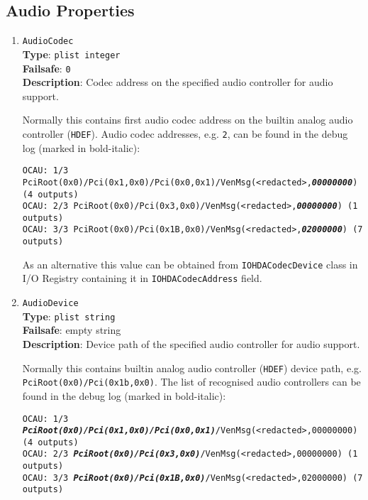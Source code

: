 \documentclass[]{article}
\begin{document}
\subsection{Audio Properties}\label{uefiaudioprops}

\begin{enumerate}

\item
  \texttt{AudioCodec}\\
  \textbf{Type}: \texttt{plist\ integer}\\
  \textbf{Failsafe}: \texttt{0}\\
  \textbf{Description}: Codec address on the specified audio controller for audio support.

  Normally this contains first audio codec address on the builtin analog audio controller (\texttt{HDEF}).
  Audio codec addresses, e.g. \texttt{2}, can be found in the debug log (marked in bold-italic):

  \texttt{OCAU: 1/3 PciRoot(0x0)/Pci(0x1,0x0)/Pci(0x0,0x1)/VenMsg(<redacted>,\textit{\textbf{00000000}}) (4 outputs)}\\
  \texttt{OCAU: 2/3 PciRoot(0x0)/Pci(0x3,0x0)/VenMsg(<redacted>,\textit{\textbf{00000000}}) (1 outputs)}\\
  \texttt{OCAU: 3/3 PciRoot(0x0)/Pci(0x1B,0x0)/VenMsg(<redacted>,\textit{\textbf{02000000}}) (7 outputs)}

  As an alternative this value can be obtained from \texttt{IOHDACodecDevice} class in I/O Registry
  containing it in \texttt{IOHDACodecAddress} field.

\item
  \texttt{AudioDevice}\\
  \textbf{Type}: \texttt{plist\ string}\\
  \textbf{Failsafe}: empty string\\
  \textbf{Description}: Device path of the specified audio controller for audio support.

  Normally this contains builtin analog audio controller (\texttt{HDEF}) device path,
  e.g. \texttt{PciRoot(0x0)/Pci(0x1b,0x0)}. The list of recognised audio controllers can be
  found in the debug log (marked in bold-italic):

  \texttt{OCAU: 1/3 \textit{\textbf{PciRoot(0x0)/Pci(0x1,0x0)/Pci(0x0,0x1)}}/VenMsg(<redacted>,00000000) (4 outputs)}\\
  \texttt{OCAU: 2/3 \textit{\textbf{PciRoot(0x0)/Pci(0x3,0x0)}}/VenMsg(<redacted>,00000000) (1 outputs)}\\
  \texttt{OCAU: 3/3 \textit{\textbf{PciRoot(0x0)/Pci(0x1B,0x0)}}/VenMsg(<redacted>,02000000) (7 outputs)}


\end{enumerate}
\end{document}
